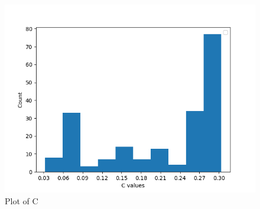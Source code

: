\begin{figure}
	\centering
	\includegraphics[scale=1]{figures/quality_evaluation_log_C_estimates.png}
	\caption[Plot C]{Plot of C}
\end{figure}